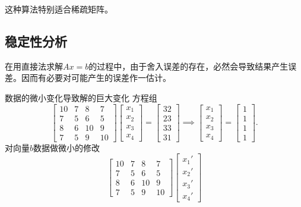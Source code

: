 \begin{remark}
    这种算法特别适合稀疏矩阵。
\end{remark}

\subsection{稳定性分析}
\label{sec:stability analysis}

在用直接法求解$Ax=b$的过程中，由于舍入误差的存在，必然会导致结果产生误差。因而有必要对可能产生的误差作一估计。
\begin{example}
    {数据的微小变化导致解的巨大变化}{}
    方程组
    \[
        \begin{bmatrix}
            10&7&8&7\\
            7&5&6&5\\
            8&6&10&9\\
            7&5&9&10
        \end{bmatrix}\begin{bmatrix}
            x_1\\x_2\\x_3\\x_4
        \end{bmatrix}=\begin{bmatrix}
            32\\23\\33\\31
        \end{bmatrix}\implies\begin{bmatrix}
            x_1\\x_2\\x_3\\x_4
        \end{bmatrix}=\begin{bmatrix}
            1\\1\\1\\1
        \end{bmatrix}.
    \]
    对向量$b$数据做微小的修改
    \[
        \begin{bmatrix}
            10&7&8&7\\
            7&5&6&5\\
            8&6&10&9\\
            7&5&9&10
        \end{bmatrix}\begin{bmatrix}
            x_1'\\x_2'\\x_3'\\x_4'

\end{bmatrix}\]
\end{example}
